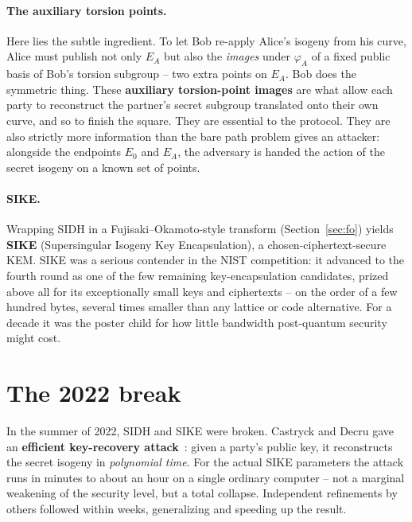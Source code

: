 \paragraph{The auxiliary torsion points.}
Here lies the subtle ingredient. To let Bob re-apply Alice's isogeny from his curve, Alice must publish not only $E_A$ but also the \emph{images} under $\varphi_A$ of a fixed public basis of Bob's torsion subgroup -- two extra points on $E_A$. Bob does the symmetric thing. These \textbf{auxiliary torsion-point images} are what allow each party to reconstruct the partner's secret subgroup translated onto their own curve, and so to finish the square. They are essential to the protocol. They are also strictly more information than the bare path problem gives an attacker: alongside the endpoints $E_0$ and $E_A$, the adversary is handed the action of the secret isogeny on a known set of points.

\paragraph{SIKE.}
Wrapping SIDH in a Fujisaki--Okamoto-style transform (Section~\ref{sec:fo}) yields \textbf{SIKE} (Supersingular Isogeny Key Encapsulation), a chosen-ciphertext-secure KEM. SIKE was a serious contender in the NIST competition: it advanced to the fourth round as one of the few remaining key-encapsulation candidates, prized above all for its exceptionally small keys and ciphertexts -- on the order of a few hundred bytes, several times smaller than any lattice or code alternative. For a decade it was the poster child for how little bandwidth post-quantum security might cost.

\section{The 2022 break}

In the summer of 2022, SIDH and SIKE were broken. Castryck and Decru gave an \textbf{efficient key-recovery attack}~\cite{castryckdecru2023}: given a party's public key, it reconstructs the secret isogeny in \emph{polynomial time}. For the actual SIKE parameters the attack runs in minutes to about an hour on a single ordinary computer -- not a marginal weakening of the security level, but a total collapse. Independent refinements by others followed within weeks, generalizing and speeding up the result.

